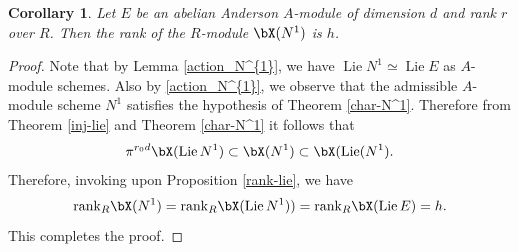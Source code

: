 \documentclass{amsart}
\newtheorem {corollary}[theorem] {\bf Corollary}
\numberwithin {equation}{section}
\DeclareMathOperator{\Lie}{\mathrm{Lie}}
\begin{document}
\begin{corollary}\label{rank-N^1} Let $E$ be an abelian Anderson $A$-module of dimension $d$ and rank $r$ over $R$. Then the rank of the $R$-module $\bX(N^{1})$ is $h$.
\end{corollary}

\begin{proof} Note that by Lemma \ref{action_N^{1}}, we have $\Lie N^{1}\simeq \Lie E$ as $A$-module schemes. Also by \eqref{action_N^{1}}, we observe that the admissible $A$-module scheme $N^{1}$ satisfies the hypothesis of Theorem \ref{char-N^1}.
Therefore from Theorem \ref{inj-lie} and Theorem \ref{char-N^1} it follows that $$\pi^{r_{0}d}\bX(\Lie N^{1})\subset \bX(N^{1})\subset \bX(\Lie(N^{1}).$$
Therefore, invoking upon Proposition \ref{rank-lie}, we have $$\mathrm{rank}_{R}\bX(N^{1})=\mathrm{rank}_{R}\bX(\Lie N^{1}))=\mathrm{rank}_{R}\bX(\Lie E)=h.$$
This completes the proof.
\end{proof}
\end{document}
